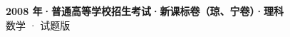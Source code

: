 \documentclass[zihao=-4, a4paper]{ctexart}
\begin{document}
\begin{center}
  {\Large\bfseries 2008 年·普通高等学校招生考试·新课标卷（琼、宁卷）·理科}\\[4pt]
  {\large 数学 · 试题版}
\end{center}
\medskip
{}

\end{document}
